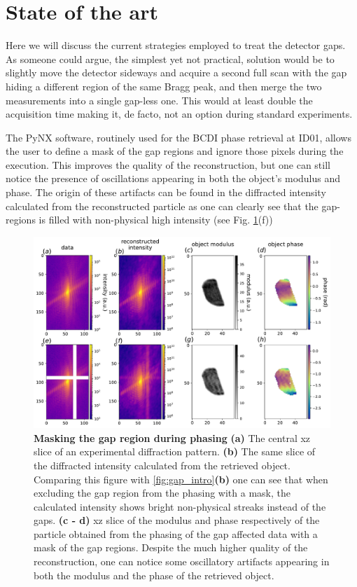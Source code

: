 \section{State of the art}\label{sec:InpStateArt}

Here we will discuss the current strategies employed to treat the detector gaps. As someone could argue, the simplest
yet not practical, solution would be to slightly move the detector sideways and acquire a second full scan with the
gap hiding a different region of the same Bragg peak, and then merge the two measurements into a single gap-less one. 
This would at least double the acquisition time making it, de facto, not an option during standard experiments. 

The PyNX software, routinely used for the BCDI phase retrieval at ID01, allows the user to define a mask of the gap 
regions and ignore those pixels during the execution. This improves the quality of the reconstruction, 
but one can still notice the presence of oscillations appearing in both the object's modulus and phase.
The origin of these artifacts can be found in the diffracted intensity calculated from the reconstructed particle as 
one can clearly see that the gap-regions is filled with non-physical high intensity (see Fig. \ref{fig:gap_intro_mask}(f))

\begin{figure}[h]
    \includegraphics[width=\textwidth]{figures/Inpainting/gaps_mask.pdf}
    \caption{\textbf{Masking the gap region during phasing} 
    \textbf{(a)} The central xz slice of an experimental diffraction pattern. \textbf{(b)} The same slice of the diffracted
    intensity calculated from the retrieved object. Comparing this figure with \ref{fig:gap_intro}\textbf{(b)} one can see that
    when excluding the gap region from the phasing with a mask, the calculated intensity shows bright non-physical streaks 
    instead of the gaps. \textbf{(c - d)} xz slice of the modulus and phase respectively of the particle obtained from the 
    phasing of the gap affected data with a mask of the gap regions. Despite the much higher quality of the reconstruction, 
    one can notice some oscillatory artifacts appearing in both the modulus and the phase of the retrieved object. }
    \label{fig:gap_intro_mask}
\end{figure}

